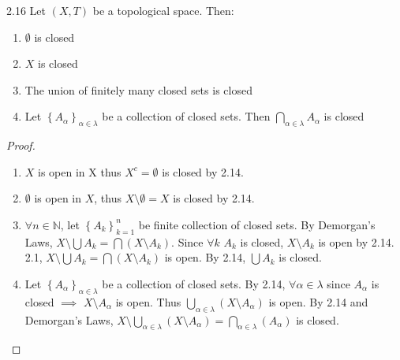\documentclass{article}
\newcommand{\N}{\mathbb{N}}
\begin{document}
\bigskip

\begin{claim}{2.16}\label{Claim 2.16.}
    Let $(X, T)$ be a topological space. Then:
    
    \begin{enumerate}
        \item $\emptyset$ is closed
        \item $X$ is closed
        \item The union of finitely many closed sets is closed
        \item Let $\left\{ A_\alpha \right\}_{\alpha \in \lambda}$ be a collection of closed sets. Then $\bigcap_{\alpha \in \lambda} A_\alpha$ is closed    
    \end{enumerate}
\end{claim}
\begin{proof}
    \begin{enumerate}
        \item $X$ is open in X thus $X^c = \emptyset$ is closed by 2.14. 
        \item $\emptyset$ is open in $X$, thus $X \setminus \emptyset = X$ is closed by 2.14.
        \item $\forall n \in \N$, let $\left\{ A_k \right\}_{k = 1}^{n}$ be finite collection of closed sets. By Demorgan's Laws, $X \setminus \bigcup A_k = \bigcap (X \setminus A_k)$. Since $\forall k$ $A_k$ is closed, $X \setminus A_k$ is open by 2.14. 2.1, $X \setminus \bigcup A_k = \bigcap (X \setminus A_k)$ is open. By 2.14, $\bigcup A_k$ is closed. 
        \item Let $\left\{ A_\alpha \right\}_{\alpha \in \lambda}$ be a collection of closed sets. By 2.14, $\forall \alpha \in \lambda$ since $A_\alpha$ is closed $\implies$ $X \setminus A_\alpha$ is open. Thus $\bigcup_{\alpha \in \lambda} \left(X \setminus A_\alpha\right)$ is open. By 2.14 and Demorgan's Laws, $X \setminus \bigcup_{\alpha \in \lambda} \left(X \setminus A_\alpha\right) = \bigcap_{\alpha \in \lambda} \left(A_\alpha\right)$ is closed.               
    \end{enumerate}
\end{proof}

\bigskip
\end{document}

